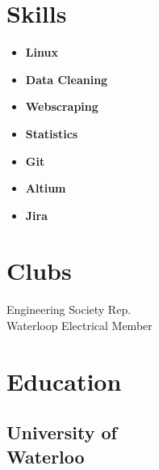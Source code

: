 \documentclass[]{chandan-cv}
\begin{document}
\begin{minipage}[t]{0.27\textwidth}
\section{Skills}
	\begin{itemize}
		\setlength\itemsep{-0.15em}
		\item \textbf{Linux}
		\item \textbf{Data Cleaning}
		\item \textbf{Webscraping}
		\item \textbf{Statistics}
		\item \textbf{Git}
		\item \textbf{Altium}
		\item \textbf{Jira}
	\end{itemize}
\sectionsep


\section{Clubs}
Engineering Society Rep.\\
Waterloop Electrical Member
\sectionsep



\section{Education}

\subsection{University of \\
Waterloo}
\sectionsep


%
%

\end{minipage}
\hfill
\end{document}
